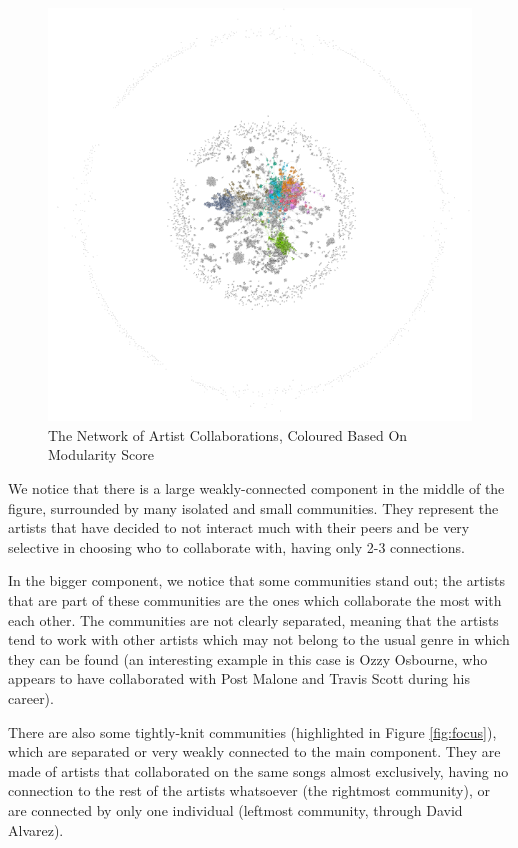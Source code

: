 \documentclass[sigchi]{acmart}
\begin{document}
\begin{figure}[h]
  \centering
  \includegraphics[width=\linewidth]{img/Final Graph.png}
  \caption{The Network of Artist Collaborations, Coloured Based On Modularity Score}
  \label{fig:network-graph}
\end{figure}

We notice that there is a large weakly-connected component in the middle of the figure, surrounded by many isolated and small communities. They represent the artists that have decided to not interact much with their peers and be very selective in choosing who to collaborate with, having only 2-3 connections. 

In the bigger component, we notice that some communities stand out; the artists that are part of these communities are the ones which collaborate the most with each other. The communities are not clearly separated, meaning that the artists tend to work with other artists which may not belong to the usual genre in which they can be found (an interesting example in this case is Ozzy Osbourne, who appears to have collaborated with Post Malone and Travis Scott during his career). 

There are also some tightly-knit communities (highlighted in Figure \ref{fig:focus}), which are separated or very weakly connected to the main component. They are made of artists that collaborated on the same songs almost exclusively, having no connection to the rest of the artists whatsoever (the rightmost community), or are connected by only one individual (leftmost community, through David Alvarez).
\end{document}
